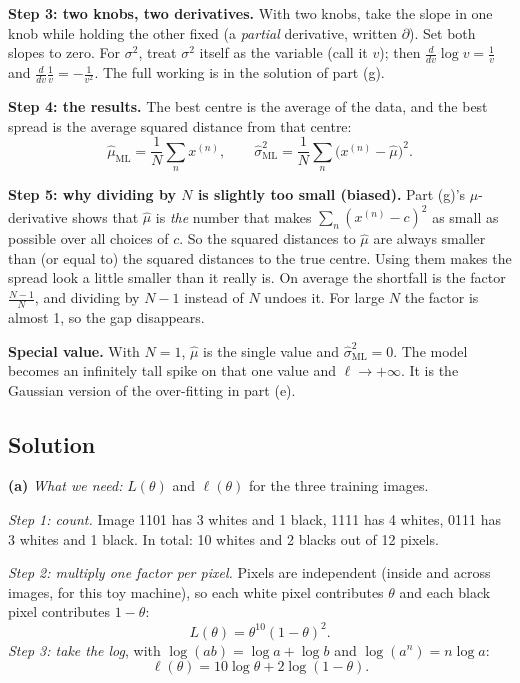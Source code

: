 \documentclass[12pt,a4paper]{article}
\begin{document}
\textbf{Step 3: two knobs, two derivatives.} With two knobs, take the slope in one knob while holding the other fixed (a \emph{partial} derivative, written $\partial$). Set both slopes to zero. For $\sigma^2$, treat $\sigma^2$ itself as the variable (call it $v$); then $\frac{d}{dv}\log v=\frac1v$ and $\frac{d}{dv}\frac1v=-\frac{1}{v^2}$. The full working is in the solution of part (g).

\textbf{Step 4: the results.} The best centre is the average of the data, and the best spread is the average squared distance from that centre:
\[
\hat\mu_{\text{ML}}=\frac1N\sum_n x^{(n)},\qquad \hat\sigma^2_{\text{ML}}=\frac1N\sum_n\big(x^{(n)}-\hat\mu\big)^2 .
\]

\textbf{Step 5: why dividing by $N$ is slightly too small (biased).} Part (g)'s $\mu$-derivative shows that $\hat\mu$ is \emph{the} number that makes $\sum_n(x^{(n)}-c)^2$ as small as possible over all choices of $c$. So the squared distances to $\hat\mu$ are always smaller than (or equal to) the squared distances to the true centre. Using them makes the spread look a little smaller than it really is. On average the shortfall is the factor $\frac{N-1}{N}$, and dividing by $N-1$ instead of $N$ undoes it. For large $N$ the factor is almost 1, so the gap disappears.

\textbf{Special value.} With $N=1$, $\hat\mu$ is the single value and $\hat\sigma^2_{\text{ML}}=0$. The model becomes an infinitely tall spike on that one value and $\ell\to+\infty$. It is the Gaussian version of the over-fitting in part (e).

\subsection{Solution}

\textbf{(a)} \emph{What we need:} $L(\theta)$ and $\ell(\theta)$ for the three training images.

\emph{Step 1: count.} Image 1101 has 3 whites and 1 black, 1111 has 4 whites, 0111 has 3 whites and 1 black. In total: 10 whites and 2 blacks out of 12 pixels.

\emph{Step 2: multiply one factor per pixel.} Pixels are independent (inside and across images, for this toy machine), so each white pixel contributes $\theta$ and each black pixel contributes $1-\theta$:
\[
L(\theta)=\theta^{10}(1-\theta)^{2}.
\]
\emph{Step 3: take the log}, with $\log(ab)=\log a+\log b$ and $\log(a^n)=n\log a$:
\[
\ell(\theta)=10\log\theta+2\log(1-\theta).
\]
\end{document}
